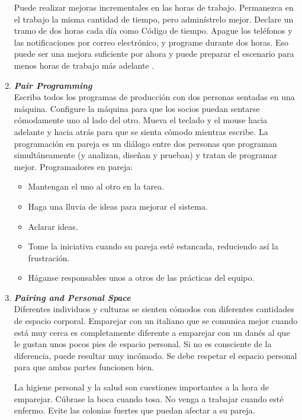 \begin{spacing}{1.5}
\begin{enumerate}
				Puede realizar mejoras incrementales en las horas de trabajo. Permanezca en el trabajo la misma cantidad de tiempo, pero adminístrelo mejor. Declare un tramo de dos horas cada día como Código de tiempo. Apague los teléfonos y las notificaciones por correo electrónico, y programe durante dos horas. Eso puede ser una mejora suficiente por ahora y puede preparar el escenario para menos horas de trabajo más adelante \cite{chap2_extreme_programming}.
				\item \textit{\textbf{Pair Programming}}\\
				Escriba todos los programas de producción con dos personas sentadas en una máquina. Configure la máquina para que los socios puedan sentarse cómodamente uno al lado del otro. Mueva el teclado y el mouse hacia adelante y hacia atrás para que se sienta cómodo mientras escribe. La programación en pareja es un diálogo entre dos personas que programan simultáneamente (y analizan, diseñan y prueban) y tratan de programar mejor. Programadores en pareja:
				\begin{itemize}
					\item Mantengan el uno al otro en la tarea.
					\item Haga una lluvia de ideas para mejorar el sistema.
					\item Aclarar ideas.
					\item Tome la iniciativa cuando su pareja esté estancada, reduciendo así la frustración.
					\item Háganse responsables unos a otros de las prácticas del equipo.
				\end{itemize}
				\item \textit{\textbf{Pairing and Personal Space}}\\
				 Diferentes individuos y culturas se sienten cómodos con diferentes cantidades de espacio corporal. Emparejar con un italiano que se comunica mejor cuando está muy cerca es completamente diferente a emparejar con un danés al que le gustan unos pocos pies de espacio personal. Si no es consciente de la diferencia, puede resultar muy incómodo. Se debe respetar el espacio personal para que ambas partes funcionen bien.
				
				La higiene personal y la salud son cuestiones importantes a la hora de emparejar. Cúbrase la boca cuando tosa. No venga a trabajar cuando esté enfermo. Evite las colonias fuertes que puedan afectar a su pareja.
				

\end{enumerate}
\end{spacing}
